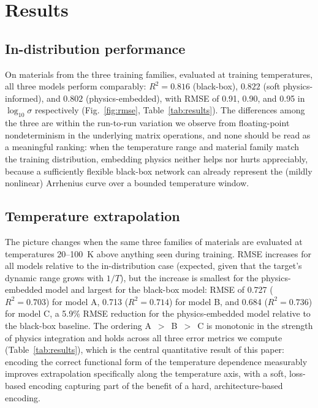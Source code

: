 \documentclass[11pt]{article}
\begin{document}
\section{Results}
\label{sec:results}

\subsection{In-distribution performance}

On materials from the three training families, evaluated at training temperatures, all three models perform comparably: $R^2 = 0.816$ (black-box), $0.822$ (soft physics-informed), and $0.802$ (physics-embedded), with RMSE of 0.91, 0.90, and 0.95 in $\log_{10}\sigma$ respectively (Fig.~\ref{fig:rmse}, Table~\ref{tab:results}). The differences among the three are within the run-to-run variation we observe from floating-point nondeterminism in the underlying matrix operations, and none should be read as a meaningful ranking: when the temperature range and material family match the training distribution, embedding physics neither helps nor hurts appreciably, because a sufficiently flexible black-box network can already represent the (mildly nonlinear) Arrhenius curve over a bounded temperature window.

\subsection{Temperature extrapolation}

The picture changes when the same three families of materials are evaluated at temperatures 20–100~K above anything seen during training. RMSE increases for all models relative to the in-distribution case (expected, given that the target's dynamic range grows with $1/T$), but the increase is smallest for the physics-embedded model and largest for the black-box model: RMSE of 0.727 ($R^2=0.703$) for model A, 0.713 ($R^2=0.714$) for model B, and 0.684 ($R^2=0.736$) for model C, a 5.9\% RMSE reduction for the physics-embedded model relative to the black-box baseline. The ordering A~$>$~B~$>$~C is monotonic in the strength of physics integration and holds across all three error metrics we compute (Table~\ref{tab:results}), which is the central quantitative result of this paper: encoding the correct functional form of the temperature dependence measurably improves extrapolation specifically along the temperature axis, with a soft, loss-based encoding capturing part of the benefit of a hard, architecture-based encoding.
\end{document}
